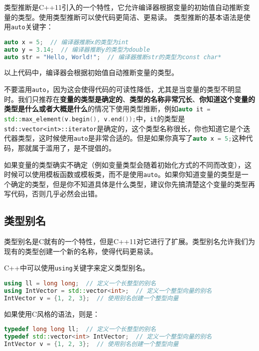 \documentclass[../main.tex]{subfiles}
\begin{document}
类型推断是C++11引入的一个特性，它允许编译器根据变量的初始值自动推断变量的类型。使用类型推断可以使代码更简洁、更易读。
类型推断的基本语法是使用\texttt{auto}关键字：
\begin{lstlisting}[language=C++]
auto x = 5;  // 编译器推断x的类型为int
auto y = 3.14;  // 编译器推断y的类型为double
auto str = "Hello, World!";  // 编译器推断str的类型为const char*
\end{lstlisting}
以上代码中，编译器会根据初始值自动推断变量的类型。

\begin{caution}
    不要滥用\texttt{auto}，因为这会使得代码的可读性降低，尤其是当变量的类型不明显时。我们只推荐在\textbf{变量的类型是确定的}、\textbf{类型的名称非常冗长}、\textbf{你知道这个变量的类型是什么或者大概是什么}的情况下使用类型推断，例如\lstinline[language=C++]|auto it = std::max_element(v.begin(), v.end());|中，\texttt{it}的类型是\texttt{std::vector<int>::iterator}是确定的，这个类型名称很长，你也知道它是个迭代器类型，这时候使用\texttt{auto}是非常合适的。但是如果你真写了\lstinline[language=C++]|auto x = 5;|这种代码，那就属于滥用了，是不提倡的。

    如果变量的类型确实不确定（例如变量类型会随着初始化方式的不同而改变），这时候可以使用模板函数或模板类，而不是使用\texttt{auto}。如果你知道变量的类型是一个确定的类型，但是你不知道具体是什么类型，建议你先搞清楚这个变量的类型再写代码，否则几乎必然会出错。
\end{caution}

\subsection{类型别名}

类型别名是C就有的一个特性，但是C++11对它进行了扩展。类型别名允许我们为现有的类型创建一个新的名称，使得代码更易读。

C++中可以使用\texttt{using}关键字来定义类型别名。
\begin{lstlisting}[language=C++]
using ll = long long;  // 定义一个长整型的别名
using IntVector = std::vector<int>;  // 定义一个整型向量的别名
IntVector v = {1, 2, 3};  // 使用别名创建一个整型向量
\end{lstlisting}

如果使用C风格的语法，则是：
\begin{lstlisting}[language=C++]
typedef long long ll;  // 定义一个长整型的别名
typedef std::vector<int> IntVector;  // 定义一个整型向量的别名
IntVector v = {1, 2, 3};  // 使用别名创建一个整型向量
\end{lstlisting}
\end{document}
